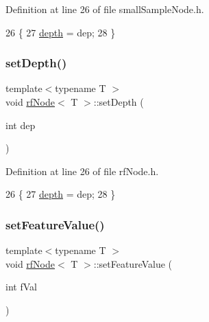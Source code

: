 Definition at line 26 of file small\+Sample\+Node.\+h.


\begin{DoxyCode}
26                              \{
27             \hyperlink{classrfNode_a7cb8fb854d8ec90635bd7207d8b8c31e}{depth} = dep;
28         \}
\end{DoxyCode}
\mbox{\label{classrfNode_a3de3a667502b31a45f90e92a7ae767e8}} 
\subsubsection{\texorpdfstring{set\+Depth()}{setDepth()}\hspace{0.1cm}{\footnotesize\ttfamily [2/2]}}
{\footnotesize\ttfamily template$<$typename T $>$ \\
void \hyperlink{classrfNode}{rf\+Node}$<$ T $>$\+::set\+Depth (\begin{DoxyParamCaption}\item[{int}]{dep }\end{DoxyParamCaption})\hspace{0.3cm}{\ttfamily [inline]}}



Definition at line 26 of file rf\+Node.\+h.


\begin{DoxyCode}
26                              \{
27             \hyperlink{classrfNode_a7cb8fb854d8ec90635bd7207d8b8c31e}{depth} = dep;
28         \}
\end{DoxyCode}
\mbox{\label{classrfNode_a6a713bccdf5e59978075b0171bdaae73}} 
\subsubsection{\texorpdfstring{set\+Feature\+Value()}{setFeatureValue()}\hspace{0.1cm}{\footnotesize\ttfamily [1/2]}}
{\footnotesize\ttfamily template$<$typename T $>$ \\
void \hyperlink{classrfNode}{rf\+Node}$<$ T $>$\+::set\+Feature\+Value (\begin{DoxyParamCaption}\item[{int}]{f\+Val }\end{DoxyParamCaption})\hspace{0.3cm}{\ttfamily [inline]}}



